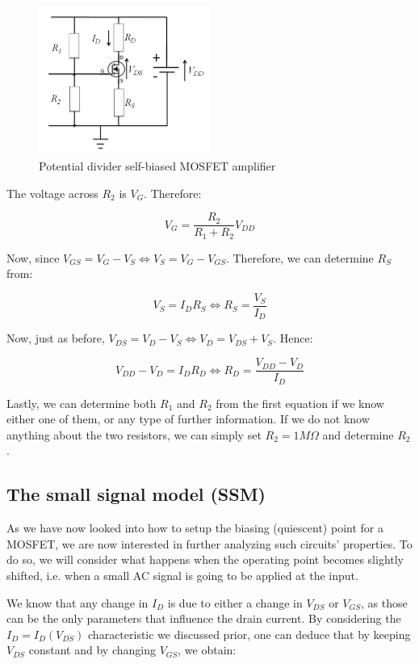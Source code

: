 \documentclass{article}
\begin{document}
\newpage

\begin{figure}[h]
    \centering
    \includegraphics[width = 0.5\textwidth]{images/fet7.png}
    \caption{Potential divider self-biased MOSFET amplifier}
    \label{fig:enter-label}
\end{figure}

The voltage across $R_2$ is $V_G$. Therefore:

\[ V_G = \frac{R_2}{R_1 + R_2}V_{DD} \]

Now, since $V_{GS} = V_G - V_S \iff V_S = V_G - V_{GS}$. Therefore, we can determine $R_S$ from:

\[ V_S = I_DR_S \iff R_S = \frac{V_S}{I_D} \]

Now, just as before, $V_{DS} = V_D - V_S \iff V_D = V_{DS} + V_S$. Hence:

\[ V_{DD} - V_D = I_DR_D \iff R_D = \frac{V_{DD} - V_D}{I_D} \]

Lastly, we can determine both $R_1$ and $R_2$ from the first equation if we know either one of them, or any type of further information. If we do not know anything about the two resistors, we can simply set $R_2 = 1M\Omega$ and determine $R_2$.

\newpage

\subsection{The small signal model (SSM)}

As we have now looked into how to setup the biasing (quiescent) point for a MOSFET, we are now interested in further analyzing such circuits' properties. To do so, we will consider what happens when the operating point becomes slightly shifted, i.e. when a small AC signal is going to be applied at the input.

We know that any change in $I_D$ is due to either a change in $V_{DS}$ or $V_{GS}$, as those can be the only parameters that influence the drain current. By considering the $I_D = I_D(V_{DS})$ characteristic we discussed prior, one can deduce that by keeping $V_{DS}$ constant and by changing $V_{GS}$, we obtain:
\end{document}
